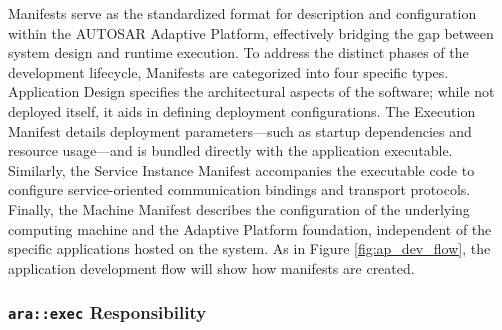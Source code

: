 Manifests serve as the standardized format for description and configuration within the AUTOSAR Adaptive Platform, effectively bridging the gap between system design and runtime execution. To address the distinct phases of the development lifecycle, Manifests are categorized into four specific types. {Application Design} specifies the architectural aspects of the software; while not deployed itself, it aids in defining deployment configurations. The {Execution Manifest} details deployment parameters—such as startup dependencies and resource usage—and is bundled directly with the application executable. Similarly, the {Service Instance Manifest} accompanies the executable code to configure service-oriented communication bindings and transport protocols. Finally, the {Machine Manifest} describes the configuration of the underlying computing machine and the Adaptive Platform foundation, independent of the specific applications hosted on the system. As in Figure \ref{fig:ap_dev_flow}, the application development flow will show how manifests are created. 

\subsubsection{\texttt{ara::exec} Responsibility}



